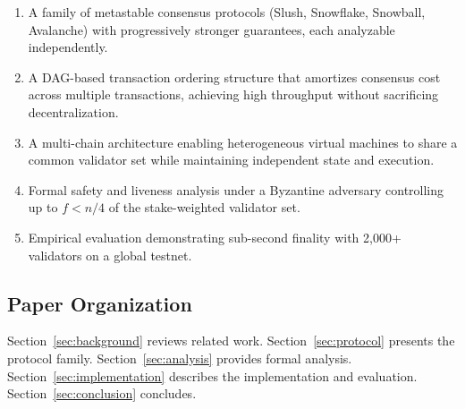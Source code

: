 \begin{enumerate}
    \item A family of metastable consensus protocols (Slush, Snowflake, Snowball, Avalanche) with progressively stronger guarantees, each analyzable independently.
    \item A DAG-based transaction ordering structure that amortizes consensus cost across multiple transactions, achieving high throughput without sacrificing decentralization.
    \item A multi-chain architecture enabling heterogeneous virtual machines to share a common validator set while maintaining independent state and execution.
    \item Formal safety and liveness analysis under a Byzantine adversary controlling up to $f < n/4$ of the stake-weighted validator set.
    \item Empirical evaluation demonstrating sub-second finality with 2,000+ validators on a global testnet.
\end{enumerate}

\subsection{Paper Organization}

Section~\ref{sec:background} reviews related work. Section~\ref{sec:protocol} presents the protocol family. Section~\ref{sec:analysis} provides formal analysis. Section~\ref{sec:implementation} describes the implementation and evaluation. Section~\ref{sec:conclusion} concludes.
